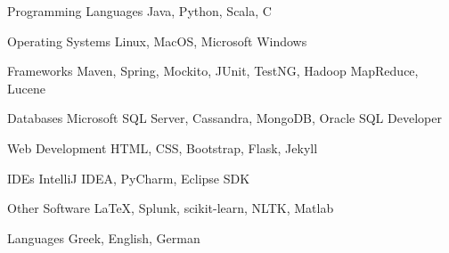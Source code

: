 

\begin{cvskills}

  \cvskill
    {Programming Languages} %
    {Java, Python, Scala, C} %

  \cvskill
    {Operating Systems} %
    {Linux, MacOS, Microsoft Windows} %
    
  \cvskill
    {Frameworks} %
    {Maven, Spring, Mockito, JUnit, TestNG, Hadoop MapReduce, Lucene} %

  \cvskill
    {Databases} %
    {Microsoft SQL Server, Cassandra, MongoDB, Oracle SQL Developer} %

  \cvskill
    {Web Development} %
    {HTML, CSS, Bootstrap, Flask, Jekyll} %

  \cvskill
    {IDEs} %
    {IntelliJ IDEA, PyCharm, Eclipse SDK} %

  \cvskill
    {Other Software} %
    {LaTeX, Splunk, scikit-learn, NLTK, Matlab} %

  \cvskill
    {Languages} %
    {Greek, English, German} %

\end{cvskills}

